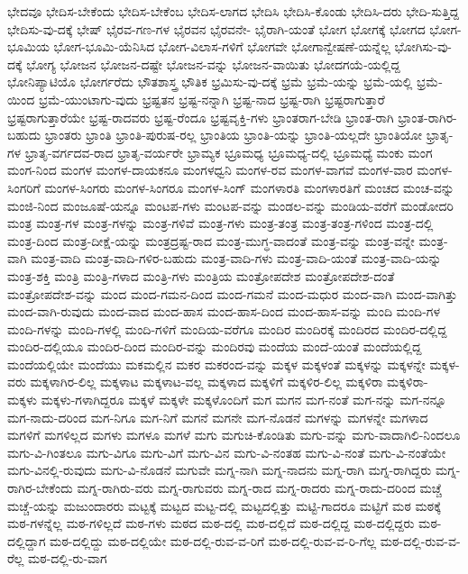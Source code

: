 {ಭೇದವೂ
ಭೇದಿಸ-ಬೇಕೆಂದು
ಭೇದಿಸ-ಬೇಕೆಂಬ
ಭೇದಿಸ-ಲಾಗದ
ಭೇದಿಸಿ
ಭೇದಿಸಿ-ಕೊಂಡು
ಭೇದಿಸಿ-ದರು
ಭೇದಿ-ಸುತ್ತಿದ್ದ
ಭೇದಿಸು-ವು-ದಕ್ಕೆ
ಭೇಷ್
ಭೈರವ-ಗಣ-ಗಳ
ಭೈರವನ
ಭೈರವನೇ-
ಭೈರಾಗಿ-ಯಂತೆ
ಭೋಗ
ಭೋಗಕ್ಕೆ
ಭೋಗದ
ಭೋಗ-ಭೂಮಿಯ
ಭೋಗ-ಭೂಮಿ-ಯೆನಿಸಿದ
ಭೋಗ-ವಿಲಾಸ-ಗಳಿಗೆ
ಭೋಗವೇ
ಭೋಗಾನ್ವೇಷಣೆ-ಯನ್ನೆಲ್ಲ
ಭೋಗಿಸು-ವು-ದಕ್ಕೆ
ಭೋಗ್ಯ
ಭೋಜನ
ಭೋಜನ-ದಷ್ಟೇ
ಭೋಜನ-ವನ್ನು
ಭೋಜನ-ವಾಯಿತು
ಭೋದಗಯೆ-ಯಲ್ಲಿದ್ದ
ಭೋನಿಪ್ಯಾಟಿಯೊ
ಭೋರ್ಗರೆದು
ಭೌತಶಾಸ್ತ್ರ
ಭೌತಿಕ
ಭ್ರಮಿಸು-ವು-ದಕ್ಕೆ
ಭ್ರಮೆ
ಭ್ರಮೆ-ಯನ್ನು
ಭ್ರಮೆ-ಯಲ್ಲಿ
ಭ್ರಮೆ-ಯಿಂದ
ಭ್ರಮೆ-ಯುಂಟಾಗು-ವುದು
ಭ್ರಷ್ಟತನ
ಭ್ರಷ್ಟ-ನನ್ನಾಗಿ
ಭ್ರಷ್ಟ-ನಾದ
ಭ್ರಷ್ಟ-ರಾಗಿ
ಭ್ರಷ್ಟರಾಗುತ್ತಾರೆ
ಭ್ರಷ್ಟರಾಗುತ್ತಾರೆಯೇ
ಭ್ರಷ್ಟ-ರಾದವರು
ಭ್ರಷ್ಟ-ರೆಂದೂ
ಭ್ರಷ್ಟವೃಕ್ತಿ-ಗಳು
ಭ್ರಾಂತರಾಗ-ಬೇಡಿ
ಭ್ರಾಂತ-ರಾಗಿ
ಭ್ರಾಂತ-ರಾಗಿರ-ಬಹುದು
ಭ್ರಾಂತರು
ಭ್ರಾಂತಿ
ಭ್ರಾಂತಿ-ಪುರುಷ-ರಲ್ಲ
ಭ್ರಾಂತಿಯ
ಭ್ರಾಂತಿ-ಯನ್ನು
ಭ್ರಾಂತಿ-ಯಲ್ಲದೇ
ಭ್ರಾಂತಿಯೋ
ಭ್ರಾತೃ-ಗಳ
ಭ್ರಾತೃ-ವರ್ಗದವ-ರಾದ
ಭ್ರಾತೃ-ವರ್ಯರೇ
ಭ್ರಾಮ್ಯಕ
ಭ್ರೂಮಧ್ಯ
ಭ್ರೂಮಧ್ಯ-ದಲ್ಲಿ
ಭ್ರೂಮಧ್ಯೆ
ಮಂಕು
ಮಂಗ
ಮಂಗ-ನಿಂದ
ಮಂಗಳ
ಮಂಗಳ-ದಾಯಕನೂ
ಮಂಗಳಧ್ವನಿ
ಮಂಗಳ-ರವ
ಮಂಗಳ-ವಾಗವೆ
ಮಂಗಳ-ವಾರ
ಮಂಗಳ-ಸಿಂಗರಿಗೆ
ಮಂಗಳ-ಸಿಂಗರು
ಮಂಗಳ-ಸಿಂಗರೂ
ಮಂಗಳ-ಸಿಂಗ್
ಮಂಗಳಾರತಿ
ಮಂಗಳಾರತಿಗೆ
ಮಂಚದ
ಮಂಚ-ವನ್ನು
ಮಂಜಿ-ನಿಂದ
ಮಂಜೂಷೆ-ಯನ್ನೂ
ಮಂಟಪ-ಗಳು
ಮಂಟಪ-ವನ್ನು
ಮಂಡಲ-ವನ್ನು
ಮಂಡಿಯ-ವರೆಗೆ
ಮಂಡೋದರಿ
ಮಂತ್ರ
ಮಂತ್ರ-ಗಳ
ಮಂತ್ರ-ಗಳನ್ನು
ಮಂತ್ರ-ಗಳಿವೆ
ಮಂತ್ರ-ಗಳು
ಮಂತ್ರ-ತಂತ್ರ
ಮಂತ್ರ-ತಂತ್ರ-ಗಳಿಂದ
ಮಂತ್ರ-ದಲ್ಲಿ
ಮಂತ್ರ-ದಿಂದ
ಮಂತ್ರ-ದೀಕ್ಷೆ-ಯನ್ನು
ಮಂತ್ರದ್ರಷ್ಟ-ರಾದ
ಮಂತ್ರ-ಮುಗ್ಧ-ವಾದಂತೆ
ಮಂತ್ರ-ವನ್ನು
ಮಂತ್ರ-ವನ್ನೇ
ಮಂತ್ರ-ವಾಗಿ
ಮಂತ್ರ-ವಾದಿ
ಮಂತ್ರ-ವಾದಿ-ಗಳಿರ-ಬಹುದು
ಮಂತ್ರ-ವಾದಿ-ಗಳು
ಮಂತ್ರ-ವಾದಿ-ಯಂತೆ
ಮಂತ್ರ-ವಾದಿ-ಯನ್ನು
ಮಂತ್ರ-ಶಕ್ತಿ
ಮಂತ್ರಿ
ಮಂತ್ರಿ-ಗಳಾದ
ಮಂತ್ರಿ-ಗಳು
ಮಂತ್ರಿಯ
ಮಂತ್ರೋಪದೇಶ
ಮಂತ್ರೋಪದೇಶ-ದಂತೆ
ಮಂತ್ರೋಪದೇಶ-ವನ್ನು
ಮಂದ
ಮಂದ-ಗಮನ-ದಿಂದ
ಮಂದ-ಗಮನೆ
ಮಂದ-ಮಧುರ
ಮಂದ-ವಾಗಿ
ಮಂದ-ವಾಗಿತ್ತು
ಮಂದ-ವಾಗಿ-ರುವುದು
ಮಂದ-ವಾದ
ಮಂದ-ಹಾಸ
ಮಂದ-ಹಾಸ-ದಿಂದ
ಮಂದ-ಹಾಸ-ವನ್ನು
ಮಂದಿ
ಮಂದಿ-ಗಳ
ಮಂದಿ-ಗಳನ್ನು
ಮಂದಿ-ಗಳಲ್ಲಿ
ಮಂದಿ-ಗಳಿಗೆ
ಮಂದಿಯ-ವರೆಗೂ
ಮಂದಿರ
ಮಂದಿರಕ್ಕೆ
ಮಂದಿರದ
ಮಂದಿರ-ದಲ್ಲಿದ್ದ
ಮಂದಿರ-ದಲ್ಲಿಯೂ
ಮಂದಿರ-ದಿಂದ
ಮಂದಿರ-ವನ್ನು
ಮಂದಿರವು
ಮಂದೆಯ
ಮಂದೆ-ಯಂತೆ
ಮಂದೆಯಲ್ಲಿದ್ದ
ಮಂದೆಯಲ್ಲಿಯೇ
ಮಂದೆಯು
ಮಕಮಲ್ಲಿನ
ಮಕರ
ಮಕರಂದ-ವನ್ನು
ಮಕ್ಕಳ
ಮಕ್ಕಳಂತೆ
ಮಕ್ಕಳನ್ನು
ಮಕ್ಕಳನ್ನೇ
ಮಕ್ಕಳ-ವರು
ಮಕ್ಕಳಾಗಿರ-ಲಿಲ್ಲ
ಮಕ್ಕಳಾಟ
ಮಕ್ಕಳಾಟ-ವಲ್ಲ
ಮಕ್ಕಳಾದ
ಮಕ್ಕಳಿಗೆ
ಮಕ್ಕಳಿರ-ಲಿಲ್ಲ
ಮಕ್ಕಳಿರಾ
ಮಕ್ಕಳಿರಾ-
ಮಕ್ಕಳು
ಮಕ್ಕಳು-ಗಳಾಗಿದ್ದರೂ
ಮಕ್ಕಳೆ
ಮಕ್ಕಳೇ
ಮಕ್ಕಳೊಂದಿಗೆ
ಮಗ
ಮಗನ
ಮಗ-ನಂತೆ
ಮಗ-ನನ್ನು
ಮಗ-ನನ್ನೂ
ಮಗ-ನಾದು-ದರಿಂದ
ಮಗ-ನಿಗೂ
ಮಗ-ನಿಗೆ
ಮಗನೆ
ಮಗನೇ
ಮಗ-ನೊಡನೆ
ಮಗಳನ್ನು
ಮಗಳನ್ನೇ
ಮಗಳಾದ
ಮಗಳಿಗೆ
ಮಗಳಿಲ್ಲದ
ಮಗಳು
ಮಗಳೂ
ಮಗಳೆ
ಮಗು
ಮಗುಚಿ-ಕೊಂಡಿತು
ಮಗು-ವನ್ನು
ಮಗು-ವಾದಾಗಿಲಿ-ನಿಂದಲೂ
ಮಗು-ವಿ-ಗಿಂತಲೂ
ಮಗು-ವಿಗೂ
ಮಗು-ವಿಗೆ
ಮಗು-ವಿನ
ಮಗು-ವಿ-ನಂತಹ
ಮಗು-ವಿ-ನಂತೆ
ಮಗು-ವಿ-ನಂತೆಯೇ
ಮಗು-ವಿನಲ್ಲಿ-ರುವುದು
ಮಗು-ವಿ-ನೊಡನೆ
ಮಗುವೇ
ಮಗ್ನ-ನಾಗಿ
ಮಗ್ನ-ನಾದನು
ಮಗ್ನ-ರಾಗಿ
ಮಗ್ನ-ರಾಗಿದ್ದರು
ಮಗ್ನ-ರಾಗಿರ-ಬೇಕೆಂದು
ಮಗ್ನ-ರಾಗಿರು-ವರು
ಮಗ್ನ-ರಾಗುವರು
ಮಗ್ನ-ರಾದ
ಮಗ್ನ-ರಾದರು
ಮಗ್ನ-ರಾದು-ದರಿಂದ
ಮಚ್ಚೆ
ಮಚ್ಚೆ-ಯನ್ನು
ಮಜುಂದಾರರು
ಮಟ್ಟಕ್ಕೆ
ಮಟ್ಟದ
ಮಟ್ಟ-ದಲ್ಲಿ
ಮಟ್ಟದಲ್ಲಿತ್ತು
ಮಟ್ಟಿ-ಗಾದರೂ
ಮಟ್ಟಿಗೆ
ಮಠ
ಮಠಕ್ಕೆ
ಮಠ-ಗಳನ್ನೆಲ್ಲ
ಮಠ-ಗಳಿಲ್ಲದೆ
ಮಠ-ಗಳು
ಮಠದ
ಮಠ-ದಲ್ಲಿ
ಮಠ-ದಲ್ಲಿದೆ
ಮಠ-ದಲ್ಲಿದ್ದ
ಮಠ-ದಲ್ಲಿದ್ದರು
ಮಠ-ದಲ್ಲಿದ್ದಾಗ
ಮಠ-ದಲ್ಲಿದ್ದು
ಮಠ-ದಲ್ಲಿಯೇ
ಮಠ-ದಲ್ಲಿ-ರುವ-ವ-ರಿಗೆ
ಮಠ-ದಲ್ಲಿ-ರುವ-ವ-ರಿ-ಗೆಲ್ಲ
ಮಠ-ದಲ್ಲಿ-ರುವ-ವ-ರೆಲ್ಲ
ಮಠ-ದಲ್ಲಿ-ರು-ವಾಗ
}
